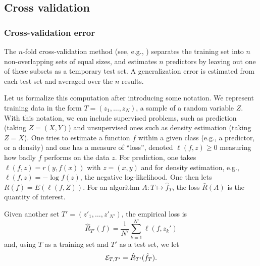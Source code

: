 

\subsection{Cross validation}

\subsubsection{Cross-validation error}
The $n$-fold cross-validation method (see, e.g., \citet{stone1974cross}) separates the training set into $n$ non-overlapping
sets of equal sizes, and estimates $n$ predictors by leaving out one
of these subsets as a temporary test set. A generalization error is 
estimated from each test set and averaged over the $n$ results.  

Let us formalize this computation after introducing some notation. We represent training data in the form $T = (z_1, \ldots, z_N)$, a sample of a random variable $Z$. With this notation, we can include supervised problems, such as prediction (taking $Z = (X,Y)$) and unsupervised ones such as density estimation (taking $Z=X$). One tries to estimate a function $f$ within a given class (e.g., a predictor, or a density) and one has a measure  of ``loss'', denoted $\ell(f, z)\geq 0$ measuring how badly  $f$ performs on the data $z$. For prediction, one takes $\ell(f, z) = r(y, f(x))$ with $z = (x,y)$ and for density estimation, e.g., $\ell(f, z) = - \log f(z)$, the negative log-likelihood. One then lets $R(f) = E(\ell(f, Z))$.  For an algorithm $A: T\mapsto \hat f_T$, the loss $\bar R(A)$ is the quantity of interest. 


Given another set $T' = (z'_1, \ldots, z'_{N'})$, the empirical loss is 
\[
\hat R_{T'}(f) = \frac1{N'} \sum_{k=1}^{N'} \ell(f, z_k')
\]
and, using $T$ as a training set and $T'$ as a test set, we let
\[
{\mathcal E}_{T,T'} = \hat R_{T'}({\hat{f}}_T).
\]

